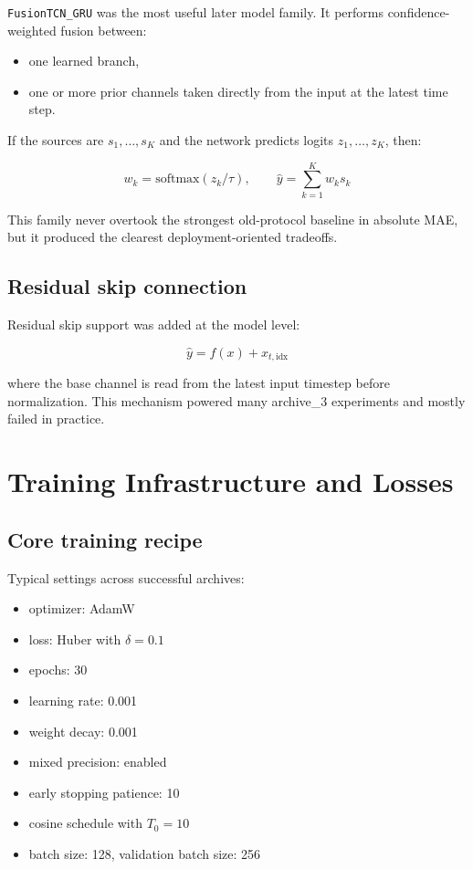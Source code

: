 \documentclass[11pt,a4paper]{article}
\begin{document}
\texttt{FusionTCN\_GRU} was the most useful later model family. It performs confidence-weighted fusion between:

\begin{itemize}
\item one learned branch,
\item one or more prior channels taken directly from the input at the latest time step.
\end{itemize}

If the sources are \(s_1,\ldots,s_K\) and the network predicts logits \(z_1,\ldots,z_K\), then:

\[
w_k = \text{softmax}(z_k / \tau), \qquad
\hat{y} = \sum_{k=1}^{K} w_k s_k
\]

This family never overtook the strongest old-protocol baseline in absolute MAE, but it produced the clearest deployment-oriented tradeoffs.

\subsection{Residual skip connection}

Residual skip support was added at the model level:

\[
\hat{y} = f(x) + x_{t,\text{idx}}
\]

where the base channel is read from the latest input timestep before normalization. This mechanism powered many archive\_3 experiments and mostly failed in practice.

\section{Training Infrastructure and Losses}

\subsection{Core training recipe}

Typical settings across successful archives:

\begin{itemize}
\item optimizer: AdamW
\item loss: Huber with \(\delta = 0.1\)
\item epochs: 30
\item learning rate: 0.001
\item weight decay: 0.001
\item mixed precision: enabled
\item early stopping patience: 10
\item cosine schedule with \(T_0=10\)
\item batch size: 128, validation batch size: 256
\end{itemize}
\end{document}

